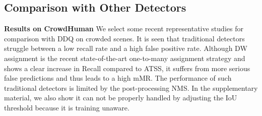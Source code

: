 \documentclass[10pt,twocolumn,letterpaper]{article}
\begin{document}
\begin{table}[!h]
    \centering
    \caption{\textbf{From Deformable DETR*(D-DETR)  to DDQ DETR}. TS D-DETR stands for the naive two-stage version. Dense means initializing the content part with feature embedding. DQS stands for distinct queries selection. AUX-Decoder means the auxiliary loss for dense queries in the decoder. The flops only has comparative meaning and does not contain custom cuda operators}
\vspace{-3mm}
    \label{tab:ddq-detr}
\end{table}

\subsection{Comparison with Other Detectors}

\noindent \textbf{Results on CrowdHuman}  We select some recent representative studies for comparison with DDQ on crowded scenes. It is seen that traditional detectors struggle between a low recall rate and a high false positive rate. Although DW~\cite{li2022dual} assignment is the recent state-of-the-art one-to-many assignment strategy and shows a clear increase in Recall compared to ATSS, it suffers from more serious false predictions and thus leads to a high mMR. The performance of such traditional detectors is limited by the post-processing NMS. In the supplementary material, we also show it can not be properly handled by adjusting the IoU threshold because it is training unaware.
\end{document}
